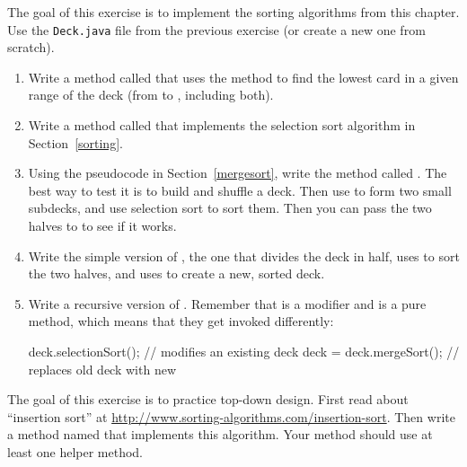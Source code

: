 \begin{exercise}  %

The goal of this exercise is to implement the sorting algorithms from this chapter.
Use the {\tt Deck.java} file from the previous exercise (or create a new one from scratch).

\begin{enumerate}

\item Write a method called  that uses the  method to find the lowest card in a given range of the deck (from  to , including both).

\item Write a method called  that implements the selection sort algorithm in Section~\ref{sorting}.

\item Using the pseudocode in Section~\ref{mergesort}, write the method called .
The best way to test it is to build and shuffle a deck.
Then use  to form two small subdecks, and use selection sort to sort them.
Then you can pass the two halves to  to see if it works.

\item Write the simple version of , the one that divides the deck in half, uses  to sort the two halves, and uses  to create a new, sorted deck.

\item Write a recursive version of .
Remember that  is a modifier and  is a pure method, which means that they get invoked differently:

\begin{code}
deck.selectionSort();      // modifies an existing deck
deck = deck.mergeSort();   // replaces old deck with new
\end{code}

\end{enumerate}

\end{exercise}


\begin{exercise}  %

The goal of this exercise is to practice top-down design.
First read about ``insertion sort'' at \url{http://www.sorting-algorithms.com/insertion-sort}.
Then write a method named  that implements this algorithm.
Your method should use at least one helper method.

\end{exercise}


